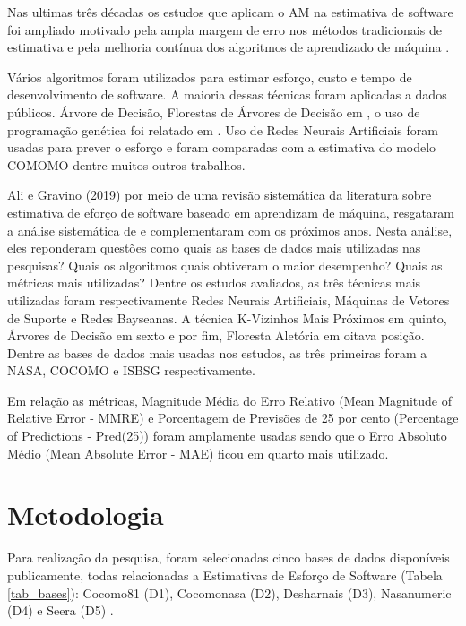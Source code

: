 \documentclass[12pt]{article}
\begin{document}
Nas ultimas três décadas os estudos que aplicam o AM na estimativa de software foi ampliado motivado pela ampla margem de erro nos métodos tradicionais de estimativa e pela melhoria contínua dos algoritmos de aprendizado de máquina \cite{banimustafa:2018}.

Vários algoritmos foram utilizados para estimar esforço, custo e tempo de desenvolvimento de software. A maioria dessas técnicas foram aplicadas a dados públicos. Árvore de Decisão, Florestas de Árvores de Decisão em \cite{nassifetal:2013}, o uso de programação genética foi relatado em \cite{chavoyaetal:2012}. Uso de Redes Neurais Artificiais foram usadas para prever o esforço e foram comparadas com a estimativa do modelo COMOMO \cite{trontoetal:2007, bhatiaattri:2015} dentre muitos outros trabalhos.

Ali e Gravino (2019) por meio de uma revisão sistemática da literatura sobre estimativa de eforço de software baseado em aprendizam de máquina, resgataram a análise sistemática de \cite{wen:2012} e complementaram com os próximos anos. Nesta análise, eles reponderam questões como quais as bases de dados mais utilizadas nas pesquisas? Quais os algoritmos quais obtiveram o maior desempenho? Quais as métricas mais utilizadas? Dentre os estudos avaliados, as três técnicas mais utilizadas foram respectivamente Redes Neurais Artificiais, Máquinas de Vetores de Suporte e Redes Bayseanas. A técnica K-Vizinhos Mais Próximos em quinto, Árvores de Decisão em sexto e por fim, Floresta Aletória em oitava posição. Dentre as bases de dados mais usadas nos estudos, as três primeiras foram a NASA, COCOMO e ISBSG respectivamente.

Em relação as métricas, Magnitude Média do Erro Relativo (Mean Magnitude of Relative Error - MMRE) e Porcentagem de Previsões de 25 por cento (Percentage of Predictions - Pred(25)) foram amplamente usadas sendo que o Erro Absoluto Médio (Mean Absolute Error - MAE) ficou em quarto mais utilizado.

\section{Metodologia}

Para realização da pesquisa, foram selecionadas cinco bases de dados disponíveis publicamente, todas  relacionadas a Estimativas de Esforço de Software (Tabela \ref{tab_bases}): Cocomo81 (D1), Cocomonasa (D2), Desharnais (D3), Nasanumeric (D4) e Seera (D5) \cite{promise:2005, nasanumeric:2014, seera:2020}.
\end{document}
